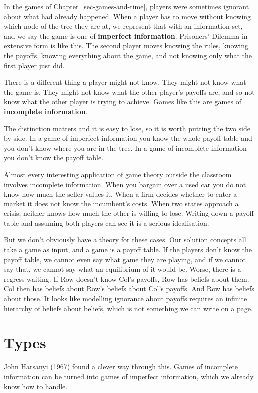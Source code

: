 \documentclass[
  11pt,
  letterpaper,
]{scrbook}
\begin{document}
In the games of Chapter~\ref{sec-games-and-time}, players were sometimes
ignorant about what had already happened. When a player has to move
without knowing which node of the tree they are at, we represent that
with an information set, and we say the game is one of \textbf{imperfect
information}. Prisoners' Dilemma in extensive form is like this. The
second player moves knowing the rules, knowing the payoffs, knowing
everything about the game, and not knowing only what the first player
just did.

There is a different thing a player might not know. They might not know
what the game is. They might not know what the other player's payoffs
are, and so not know what the other player is trying to achieve. Games
like this are games of \textbf{incomplete information}.

The distinction matters and it is easy to lose, so it is worth putting
the two side by side. In a game of imperfect information you know the
whole payoff table and you don't know where you are in the tree. In a
game of incomplete information you don't know the payoff table.

Almost every interesting application of game theory outside the
classroom involves incomplete information. When you bargain over a used
car you do not know how much the seller values it. When a firm decides
whether to enter a market it does not know the incumbent's costs. When
two states approach a crisis, neither knows how much the other is
willing to lose. Writing down a payoff table and assuming both players
can see it is a serious idealisation.

But we don't obviously have a theory for these cases. Our solution
concepts all take a game as input, and a game is a payoff table. If the
players don't know the payoff table, we cannot even say what game they
are playing, and if we cannot say that, we cannot say what an
equilibrium of it would be. Worse, there is a regress waiting. If Row
doesn't know Col's payoffs, Row has beliefs about them. Col then has
beliefs about Row's beliefs about Col's payoffs. And Row has beliefs
about those. It looks like modelling ignorance about payoffs requires an
infinite hierarchy of beliefs about beliefs, which is not something we
can write on a page.

\section{Types}\label{sec-types}

John Harsanyi (1967) found a clever way through this. Games of
incomplete information can be turned into games of imperfect
information, which we already know how to handle.
\end{document}
